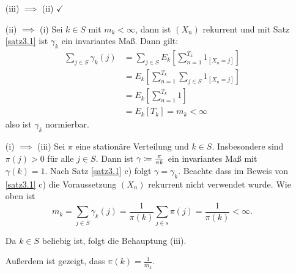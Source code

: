 \documentclass[a4paper,twoside,DIV15,BCOR12mm]{scrbook}
\begin{document}
\begin{beweis}
\begin{enumerate}[(iii) $\implies$ (ii)]
\item[(iii) $\implies$ (ii)] $\checkmark$
\item[(ii) $\implies$ (i)] Sei $k\in S$ mit $m_k<\infty$, dann ist $(X_n)$ rekurrent und mit Satz \ref{satz3.1} ist $\gamma_k$ ein invariantes Maß. Dann gilt:
\begin{align*}
\sum_{j\in S} \gamma_k(j) 
&= \sum_{j\in S} E_k[ \sum_{n=1}^{T_k} 1_{[X_n=j]}] \\
&= E_k[\sum_{n=1}^{T_k} \sum_{j\in S} 1_{[X_n=j]}] \\
&= E_k[\sum_{n=1}^{T_k} 1] \\
&= E_k[T_k] = m_k <\infty
\end{align*}
also ist $\gamma_k$ normierbar.

\item[(i) $\implies$ (iii)] Sei $\pi$ eine stationäre Verteilung und $k\in S$. Insbesondere sind $\pi(j)>0$ für alle $j\in S$. Dann ist $\gamma \da \frac{\pi}{\pi{k}}$ ein invariantes Maß mit $\gamma(k)=1$.  Nach Satz \ref{satz3.1} c) folgt $\gamma = \gamma_k$. Beachte dass im Beweis von \ref{satz3.1} c) die Voraussetzung $(X_n)$ rekurrent nicht verwendet wurde.
Wie oben ist 
\[
m_k=\sum_{j\in S}\gamma_k(j) = \frac 1 {\pi(k)} \sum_{j\in s} \pi(j) = \frac1{\pi(k)} < \infty.\]

Da $k\in S$ beliebig ist, folgt die Behauptung (iii).

Außerdem ist gezeigt, dass $\pi(k)=\frac1{m_k}$.
\end{enumerate}
\end{beweis}
\end{document}
